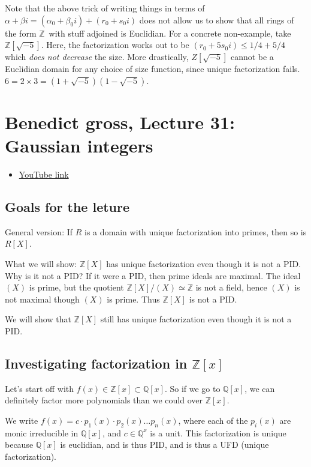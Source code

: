 \documentclass{book}
\newcommand{\Z}{\ensuremath{\mathbb{Z}}}
\newcommand{\Q}{\ensuremath{\mathbb{Q}}}
\theoremstyle{definition}
\begin{document}
Note that the above trick of writing things in terms of $\alpha + \beta i = (\alpha_0 + \beta_0 i) + (r_0 + s_0i)$
does not allow us to show that all rings of the form \Z~with stuff adjoined is Euclidian. For
a concrete non-example, take $\Z[\sqrt{-5}]$. Here, the factorization works
out to be $(r_0 + 5 s_0 i) \leq 1/4 + 5/4$ which \emph{does not decrease} the
size. More drastically, $Z[\sqrt{-5}]$ cannot be a Euclidian domain for any
choice of size function, since unique factorization fails. $6 = 2 \times 3 = (1+ \sqrt{-5})(1-\sqrt{-5})$.

\chapter{Benedict gross, Lecture 31: Gaussian integers}
\begin{itemize}
    \item \href{https://www.youtube.com/watch?v=l1OWAasmBLI&list=PLelIK3uylPMGzHBuR3hLMHrYfMqWWsmx5&index=31}{YouTube link}
\end{itemize}

\section{Goals for the leture}

General version: If $R$ is a domain with unique factorization into primes, then so is $R[X]$.

What we will show: $\Z[X]$ has unique factorization even though it is not a PID.
Why is it not a PID? If it were a PID, then prime ideals are maximal. The ideal $(X)$
is prime, but the quotient $\Z[X]/(X) \simeq \Z$ is not a field, hence $(X)$
is not maximal though $(X)$ is prime. Thus $\Z[X]$ is not a PID.

We will show that $\Z[X]$ still has unique factorization even though it is
not a PID.

\section{Investigating factorization in $\Z[x]$}

Let's start off with $f(x) \in \Z[x] \subset \Q[x]$. So if we go to $\Q[x]$,
we can definitely factor more polynomials than we could over $\Z[x]$.

We write $f(x) = c \cdot p_1(x) \cdot p_2(x) \dots p_n(x)$, where each
of the $p_i(x)$ are monic irreducible in $\Q[x]$, and $c \in \Q^x$ is a unit.
This factorization is unique because $\Q[x]$ is euclidian, and is thus
PID, and is thus a UFD (unique factorization).
\end{document}
